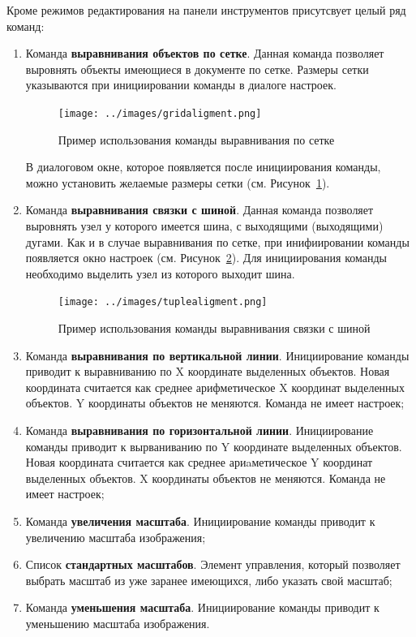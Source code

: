 Кроме режимов редактирования на панели инструментов присутсвует целый ряд команд:
\begin{enumerate}
	\item Команда \textbf{выравнивания объектов по сетке}. Данная команда позволяет выровнять объекты имеющиеся в документе по сетке. Размеры сетки указываются при инициировании команды в диалоге настроек.
\begin{figure}[h]
	\centering\texttt{[image: ../images/gridaligment.png]}
	\caption{Пример использования команды выравнивания по сетке}
	\label{gridaligment}
\end{figure}
В диалоговом окне, которое появляется после инициирования команды, можно установить желаемые размеры сетки (см. Рисунок~\ref{gridaligment}).
	\item Команда \textbf{выравнивания связки с шиной}. Данная команда позволяет выровнять узел у которого имеется шина, с выходящими (выходящими) дугами. Как и в случае выравнивания по сетке, при инифиировании команды появляется окно настроек (см. Рисунок~\ref{tuplealigment}). Для инициирования команды необходимо выделить узел из которого выходит шина.
	
\begin{figure}[h]
	\texttt{[image: ../images/tuplealigment.png]}
	\caption{Пример использования команды выравнивания связки с шиной}
	\label{tuplealigment}
\end{figure}
	\item Команда \textbf{выравнивания по вертикальной линии}. Инициирование команды приводит к выравниванию по X координате выделенных объектов. Новая координата считается как среднее арифметическое X координат выделенных объектов. Y координаты объектов не меняются. Команда не имеет настроек;
	\item Команда \textbf{выравнивания по горизонтальной линии}. Инициирование команды приводит к вырваниванию по Y координате выделенных объектов. Новая координата считается как среднее ариaметическое Y координат выделенных объектов. X координаты объектов не меняются. Команда не имеет настроек;
	\item Команда \textbf{увеличения масштаба}. Инициирование команды приводит к увеличению масштаба изображения;
	\item Список \textbf{стандартных масштабов}. Элемент управления, который позволяет выбрать масштаб из уже заранее имеющихся, либо указать свой масштаб;
	\item Команда \textbf{уменьшения масштаба}. Инициирование команды приводит к уменьшению масштаба изображения.
\end{enumerate}

